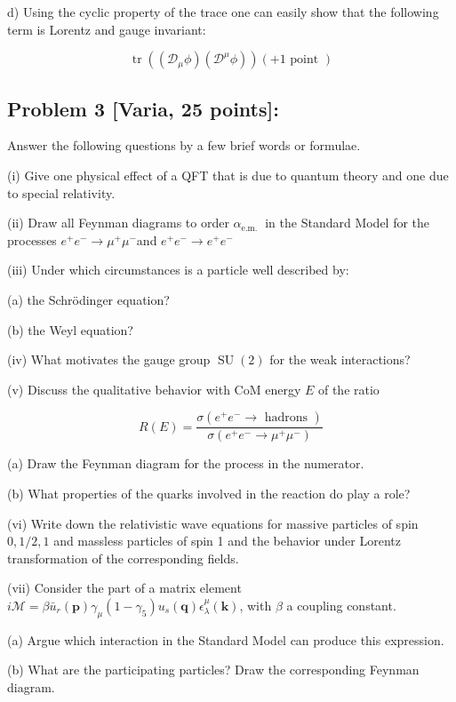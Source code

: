 \documentclass[10pt, letterpaper]{article}
\begin{document}
d) Using the cyclic property of the trace one can easily show that the following term is Lorentz and gauge invariant:

$$
\operatorname{tr}\left(\left(\mathcal{D}_\mu \phi\right)\left(\mathcal{D}^\mu \phi\right)\right)(+1 \text { point })
$$

\subsection{Problem 3 [Varia, 25 points]:}

Answer the following questions by a few brief words or formulae.

(i) Give one physical effect of a QFT that is due to quantum theory and one due to special relativity.

(ii) Draw all Feynman diagrams to order $\alpha_{\text {e.m. }}$ in the Standard Model for the processes $e^{+} e^{-} \rightarrow \mu^{+} \mu^{-}$and $e^{+} e^{-} \rightarrow e^{+} e^{-}$

(iii) Under which circumstances is a particle well described by:

(a) the Schrödinger equation?

(b) the Weyl equation?

(iv) What motivates the gauge group $\operatorname{SU}(2)$ for the weak interactions?

(v) Discuss the qualitative behavior with CoM energy $E$ of the ratio

$$
R(E)=\frac{\sigma\left(e^{+} e^{-} \rightarrow \text { hadrons }\right)}{\sigma\left(e^{+} e^{-} \rightarrow \mu^{+} \mu^{-}\right)}
$$

(a) Draw the Feynman diagram for the process in the numerator.

(b) What properties of the quarks involved in the reaction do play a role?


(vi) Write down the relativistic wave equations for massive particles of spin $0,1 / 2,1$ and massless particles of spin 1 and the behavior under Lorentz transformation of the corresponding fields.

(vii) Consider the part of a matrix element $i \mathcal{M}=\beta \bar{u}_r(\mathbf{p}) \gamma_\mu\left(1-\gamma_5\right) u_s(\mathbf{q}) \epsilon_\lambda^\mu(\mathbf{k})$, with $\beta$ a coupling constant.

(a) Argue which interaction in the Standard Model can produce this expression.

(b) What are the participating particles? Draw the corresponding Feynman diagram.
\end{document}

